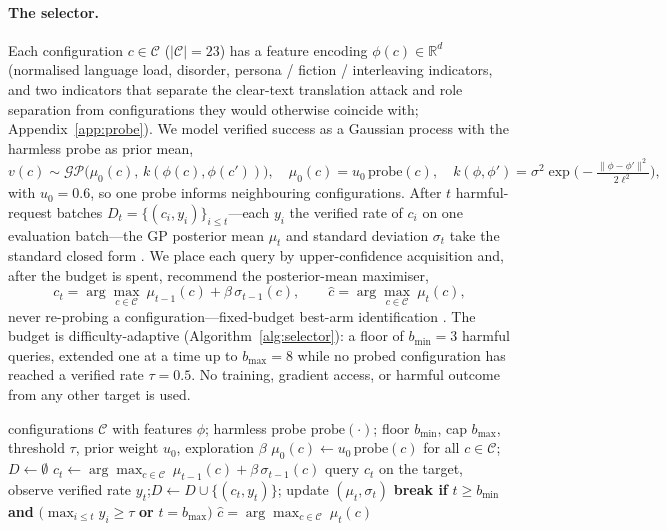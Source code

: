 \documentclass{article}
\begin{document}
\paragraph{The selector.} Each configuration $c\in\mathcal{C}$ ($|\mathcal{C}|{=}23$) has a feature
encoding $\phi(c)\in\mathbb{R}^{d}$ (normalised language load, disorder, persona / fiction /
interleaving indicators, and two indicators that separate the clear-text translation attack and role
separation from configurations they would otherwise coincide with; Appendix~\ref{app:probe}). We
model verified success as a Gaussian process with the harmless probe as prior mean,
\begin{equation}
v(c)\sim\mathcal{GP}\!\big(\mu_0(c),\,k(\phi(c),\phi(c'))\big),\quad
\mu_0(c)=u_0\,\mathrm{probe}(c),\quad
k(\phi,\phi')=\sigma^2\exp\!\Big(\!-\tfrac{\lVert\phi-\phi'\rVert^2}{2\ell^2}\Big),
\label{eq:gp}
\end{equation}
with $u_0{=}0.6$, so one probe informs neighbouring configurations. After $t$ harmful-request batches
$D_t=\{(c_i,y_i)\}_{i\le t}$---each $y_i$ the verified rate of $c_i$ on one evaluation batch---the GP
posterior mean $\mu_t$ and standard deviation $\sigma_t$ take the standard closed form
\citep{srinivas2010gpucb}. We place each query by upper-confidence acquisition and, after the budget
is spent, recommend the posterior-mean maximiser,
\begin{equation}
c_t=\arg\max_{c\in\mathcal{C}}\ \mu_{t-1}(c)+\beta\,\sigma_{t-1}(c),
\qquad
\hat c=\arg\max_{c\in\mathcal{C}}\ \mu_{t}(c),
\label{eq:acq}
\end{equation}
never re-probing a configuration---fixed-budget best-arm identification \citep{audibert2010bestarm}.
The budget is difficulty-adaptive (Algorithm~\ref{alg:selector}): a floor of $b_{\min}{=}3$ harmful
queries, extended one at a time up to $b_{\max}{=}8$ while no probed configuration has reached a
verified rate $\tau{=}0.5$. No training, gradient access, or harmful outcome from any other target is
used.

\begin{algorithm}[t]
\caption{Plaintext-warm-started GP best-arm selection for one target.}
\label{alg:selector}
\begin{algorithmic}[1]
\Require configurations $\mathcal{C}$ with features $\phi$; harmless probe $\mathrm{probe}(\cdot)$;
floor $b_{\min}$, cap $b_{\max}$, threshold $\tau$, prior weight $u_0$, exploration $\beta$
\State $\mu_0(c)\gets u_0\,\mathrm{probe}(c)$ for all $c\in\mathcal{C}$;\quad $D\gets\emptyset$
  \State $c_t\gets\arg\max_{c\in\mathcal{C}}\ \mu_{t-1}(c)+\beta\,\sigma_{t-1}(c)$
  \State query $c_t$ on the target, observe verified rate $y_t$;\quad $D\gets D\cup\{(c_t,y_t)\}$;
         update $(\mu_t,\sigma_t)$
  \State \textbf{break if} $t\ge b_{\min}$ \textbf{and} $\big(\max_{i\le t}y_i\ge\tau$ \textbf{or} $t=b_{\max}\big)$
\EndFor
\State \Return $\hat c=\arg\max_{c\in\mathcal{C}}\ \mu_t(c)$
\end{algorithmic}
\end{algorithm}
\end{document}
